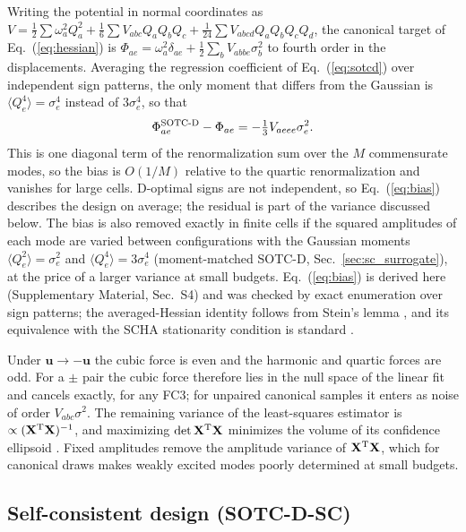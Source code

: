 \documentclass[aip,jap,reprint,amsmath,amssymb,floatfix]{revtex4-2}
\begin{document}
Writing the potential in normal
coordinates as $V=\tfrac12\sum\omega_a^2Q_a^2+\tfrac16\sum V_{abc}Q_aQ_bQ_c
+\tfrac1{24}\sum V_{abcd}Q_aQ_bQ_cQ_d$, the canonical target of Eq.~(\ref{eq:hessian}) is
$\Phi_{ae}=\omega_a^2\delta_{ae}+\tfrac12\sum_bV_{abbe}\sigma_b^2$ to fourth
order in the displacements. Averaging the regression coefficient of
Eq.~(\ref{eq:sotcd}) over independent sign patterns, the
only moment that differs from the Gaussian is $\langle Q_e^4\rangle=\sigma_e^4$
instead of $3\sigma_e^4$, so that
\begin{equation}
\Phi^{\rm SOTC\text{-}D}_{ae}-\Phi_{ae}=-\tfrac13V_{aeee}\sigma_e^2 .
\label{eq:bias}
\end{equation}
This is one diagonal term of the renormalization sum over the $M$
commensurate modes, so the bias is $O(1/M)$ relative to the quartic
renormalization and vanishes for large cells. D-optimal signs are not
independent, so Eq.~(\ref{eq:bias}) describes the design on average; the
residual is part of the variance discussed below. The bias is also removed exactly
in finite cells if the squared amplitudes of each mode are varied between
configurations with the Gaussian moments $\langle Q_e^2\rangle=\sigma_e^2$
and $\langle Q_e^4\rangle=3\sigma_e^4$ (moment-matched SOTC-D,
Sec.~\ref{sec:sc_surrogate}), at the price of a larger variance at small
budgets. Eq.~(\ref{eq:bias}) is derived
here (Supplementary Material, Sec.~S4) and was checked by exact enumeration
over sign patterns; the averaged-Hessian identity follows from Stein's lemma
\cite{ref61}, and its equivalence with the SCHA stationarity condition is
standard \cite{ref50}.

Under $\mathbf u\to-\mathbf u$ the cubic force is even and
the harmonic and quartic forces are odd. For a $\pm$ pair the cubic force
therefore lies in the null space of the linear fit and cancels exactly, for
any FC3; for unpaired canonical samples it enters as noise of order
$V_{abc}\sigma^2$. The remaining variance of the least-squares estimator is
$\propto(\mathbf X^{\rm T}\mathbf X)^{-1}$, and maximizing
$\det\mathbf X^{\rm T}\mathbf X$ minimizes the volume of its confidence
ellipsoid \cite{ref57}. Fixed amplitudes remove the amplitude variance of
$\mathbf X^{\rm T}\mathbf X$, which for canonical draws makes weakly excited
modes poorly determined at small budgets.

\subsection{Self-consistent design (SOTC-D-SC)}\label{sec:sotcdsc}
\end{document}
